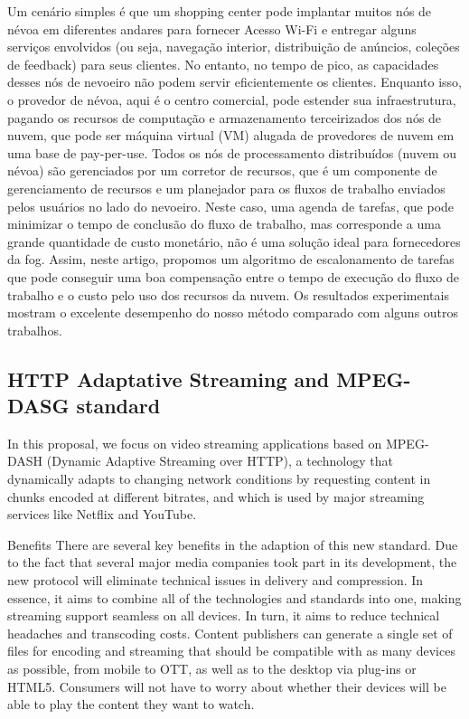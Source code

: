 Um cenário simples é que um shopping center pode implantar muitos nós de névoa em diferentes andares para fornecer Acesso Wi-Fi e entregar alguns serviços envolvidos (ou seja, navegação interior, distribuição de anúncios, coleções de feedback) para seus clientes. No entanto, no tempo de pico, as capacidades desses nós de nevoeiro não podem servir eficientemente os clientes. Enquanto isso, o provedor de névoa, aqui é o centro comercial, pode estender sua infraestrutura, pagando os recursos de computação e armazenamento terceirizados dos nós de nuvem, que pode ser máquina virtual (VM) alugada de provedores de nuvem em uma base de pay-per-use. Todos os nós de processamento distribuídos (nuvem ou névoa) são gerenciados por um corretor de recursos, que é um componente de gerenciamento de recursos e um planejador para os fluxos de trabalho enviados pelos usuários no lado do nevoeiro. Neste caso, uma agenda de tarefas, que pode minimizar o tempo de conclusão do fluxo de trabalho, mas corresponde a uma grande quantidade de custo monetário, não é uma solução ideal para fornecedores da fog. Assim, neste artigo, propomos um algoritmo de escalonamento de tarefas que pode conseguir uma boa compensação entre o tempo de execução do fluxo de trabalho e o custo pelo uso dos recursos da nuvem. Os resultados experimentais mostram o excelente desempenho do nosso método comparado com alguns outros trabalhos.

\subsection{HTTP Adaptative Streaming and MPEG-DASG standard}
\label{sec:has-dash}

In this proposal, we focus on video streaming applications based on MPEG-DASH (Dynamic
Adaptive Streaming over HTTP), a technology that dynamically
adapts to changing network conditions by requesting content in
chunks encoded at different bitrates, and which is used by major
streaming services like Netflix and YouTube.

Benefits
There are several key benefits in the adaption of this new standard. Due to the fact that several major media companies took part in its development, the new protocol will eliminate technical issues in delivery and compression. In essence, it aims to combine all of the technologies and standards into one, making streaming support seamless on all devices. In turn, it aims to reduce technical headaches and transcoding costs. Content publishers can generate a single set of files for encoding and streaming that should be compatible with as many devices as possible, from mobile to OTT, as well as to the desktop via plug-ins or HTML5. Consumers will not have to worry about whether their devices will be able to play the content they want to watch.

